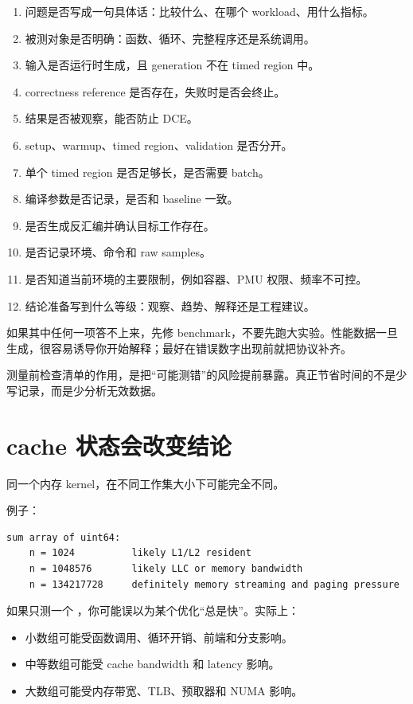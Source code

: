 \begin{enumerate}
  \item 问题是否写成一句具体话：比较什么、在哪个 workload、用什么指标。
  \item 被测对象是否明确：函数、循环、完整程序还是系统调用。
  \item 输入是否运行时生成，且 generation 不在 timed region 中。
  \item correctness reference 是否存在，失败时是否会终止。
  \item 结果是否被观察，能否防止 DCE。
  \item setup、warmup、timed region、validation 是否分开。
  \item 单个 timed region 是否足够长，是否需要 batch。
  \item 编译参数是否记录，是否和 baseline 一致。
  \item 是否生成反汇编并确认目标工作存在。
  \item 是否记录环境、命令和 raw samples。
  \item 是否知道当前环境的主要限制，例如容器、PMU 权限、频率不可控。
  \item 结论准备写到什么等级：观察、趋势、解释还是工程建议。
\end{enumerate}

如果其中任何一项答不上来，先修 benchmark，不要先跑大实验。性能数据一旦生成，很容易诱导你开始解释；最好在错误数字出现前就把协议补齐。

\begin{keyidea}
测量前检查清单的作用，是把“可能测错”的风险提前暴露。真正节省时间的不是少写记录，而是少分析无效数据。
\end{keyidea}

\section{cache 状态会改变结论}

同一个内存 kernel，在不同工作集大小下可能完全不同。

例子：

\begin{lstlisting}
sum array of uint64:
    n = 1024          likely L1/L2 resident
    n = 1048576       likely LLC or memory bandwidth
    n = 134217728     definitely memory streaming and paging pressure
\end{lstlisting}

如果只测一个 ，你可能误以为某个优化“总是快”。实际上：

\begin{itemize}
  \item 小数组可能受函数调用、循环开销、前端和分支影响。
  \item 中等数组可能受 cache bandwidth 和 latency 影响。
  \item 大数组可能受内存带宽、TLB、预取器和 NUMA 影响。
\end{itemize}

